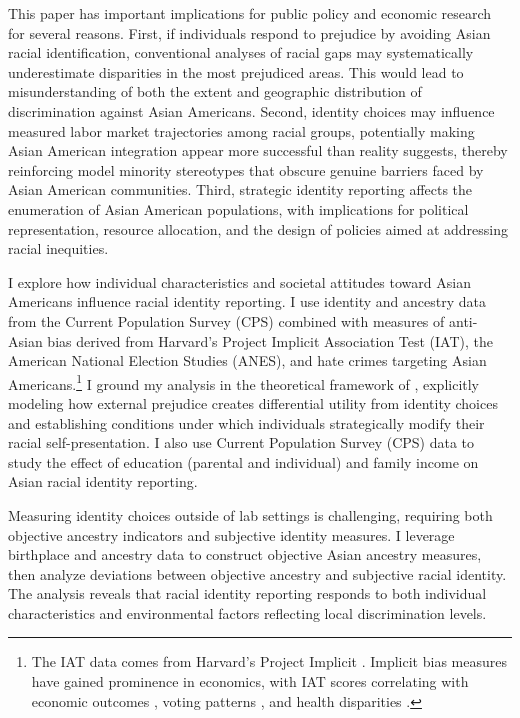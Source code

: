 This paper has important implications for public policy and economic research for several reasons. First, if individuals respond to prejudice by avoiding Asian racial identification, conventional analyses of racial gaps may systematically underestimate disparities in the most prejudiced areas. This would lead to misunderstanding of both the extent and geographic distribution of discrimination against Asian Americans. Second, identity choices may influence measured labor market trajectories among racial groups, potentially making Asian American integration appear more successful than reality suggests, thereby reinforcing model minority stereotypes that obscure genuine barriers faced by Asian American communities. Third, strategic identity reporting affects the enumeration of Asian American populations, with implications for political representation, resource allocation, and the design of policies aimed at addressing racial inequities.

I explore how individual characteristics and societal attitudes toward Asian Americans influence racial identity reporting. I use identity and ancestry data from the Current Population Survey (CPS) combined with measures of anti-Asian bias derived from Harvard's Project Implicit Association Test (IAT), the American National Election Studies (ANES), and hate crimes targeting Asian Americans.\footnote{The IAT data comes from Harvard's Project Implicit \autocite{greenwaldMeasuringIndividualDifferences1998}. Implicit bias measures have gained prominence in economics, with IAT scores correlating with economic outcomes \autocite{chettyRaceEconomicOpportunity2020,gloverDiscriminationSelfFulfillingProphecy2017}, voting patterns \autocite{friesePredictingVotingBehavior2007}, and health disparities \autocite{leitnerRacialBiasAssociated2016}.} I ground my analysis in the theoretical framework of \textcite{akerlofEconomicsIdentity2000}, explicitly modeling how external prejudice creates differential utility from identity choices and establishing conditions under which individuals strategically modify their racial self-presentation. I also use Current Population Survey (CPS) data to study the effect of education (parental and individual) and family income on Asian racial identity reporting.

Measuring identity choices outside of lab settings is challenging, requiring both objective ancestry indicators and subjective identity measures. I leverage birthplace and ancestry data to construct objective Asian ancestry measures, then analyze deviations between objective ancestry and subjective racial identity. The analysis reveals that racial identity reporting responds to both individual characteristics and environmental factors reflecting local discrimination levels.

